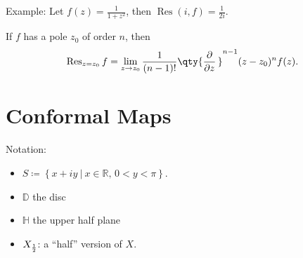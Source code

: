 Example: Let \(f(z) = \frac{1}{1+z^2}\), then
\(\operatorname{Res}(i, f) = \frac{1}{2i}\).

\begin{proposition}

If \(f\) has a pole \(z_0\) of order \(n\), then
\begin{align*}  
\operatorname{Res}_{z=z_0} f = \lim_{z\to z_0} {1 \over (n-1)!} \qty{{\frac{\partial }{\partial z}\,}}^{n-1} (z-z_0)^n f(z)
.\end{align*}

\end{proposition}

\hypertarget{conformal-maps}{%
\section{Conformal Maps}\label{conformal-maps}}

Notation:

\begin{itemize}
\tightlist
\item
  \(S \coloneqq\left\{{x + iy {~\mathrel{\Big|}~}x\in {\mathbb{R}},\, 0<y<\pi}\right\}\).
\item
  \({\mathbb{D}}\) the disc
\item
  \({\mathbb{H}}\) the upper half plane
\item
  \(X_{1\over 2}\): a ``half'' version of \(X\).
\end{itemize}

